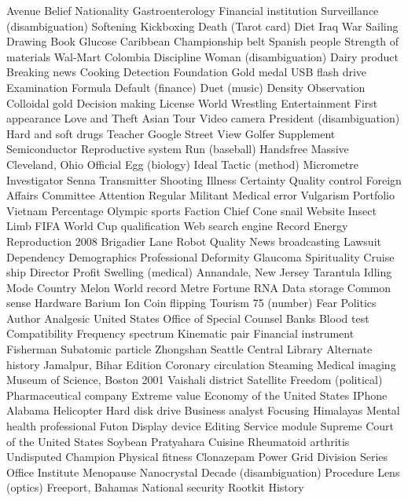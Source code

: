 Avenue  Belief  Nationality  
Gastroenterology  Financial institution  Surveillance (disambiguation)  
Softening  Kickboxing  Death (Tarot card)  
Diet  Iraq War  Sailing  
Drawing  Book  Glucose  
Caribbean  Championship belt  Spanish people  
Strength of materials  Wal-Mart  Colombia  
Discipline  Woman (disambiguation)  Dairy product  
Breaking news  Cooking  Detection  
Foundation  Gold medal  USB flash drive  
Examination  Formula  Default (finance)  
Duet (music)  Density  Observation  
Colloidal gold  Decision making  License  
World Wrestling Entertainment  First appearance  Love and Theft  
Asian Tour  Video camera  President (disambiguation)  
Hard and soft drugs  Teacher  Google Street View  
Golfer  Supplement  Semiconductor  
Reproductive system  Run (baseball)  Handsfree  
Massive  Cleveland, Ohio  Official  
Egg (biology)  Ideal  Tactic (method)  
Micrometre  Investigator  Senna  
Transmitter  Shooting  Illness  
Certainty  Quality control  Foreign Affairs Committee  
Attention  Regular  Militant  
Medical error  Vulgarism  Portfolio  
Vietnam  Percentage  Olympic sports  
Faction  Chief  Cone snail  
Website  Insect  Limb  
FIFA World Cup qualification  Web search engine  Record  
Energy  Reproduction  2008  
Brigadier  Lane  Robot  
Quality  News broadcasting  Lawsuit  
Dependency  Demographics  Professional  
Deformity  Glaucoma  Spirituality  
Cruise ship  Director  Profit  
Swelling (medical)  Annandale, New Jersey  Tarantula  
Idling  Mode  Country  
Melon  World record  Metre  
Fortune  RNA  Data storage  
Common sense  Hardware  Barium  
Ion  Coin flipping  Tourism  
75 (number)  Fear  Politics  
Author  Analgesic  United States Office of Special Counsel  
Banks  Blood test  Compatibility  
Frequency spectrum  Kinematic pair  Financial instrument  
Fisherman  Subatomic particle  Zhongshan  
Seattle Central Library  Alternate history  Jamalpur, Bihar  
Edition  Coronary circulation  Steaming  
Medical imaging  Museum of Science, Boston  2001  
Vaishali district  Satellite  Freedom (political)  
Pharmaceutical company  Extreme value  Economy of the United States  
IPhone  Alabama  Helicopter  
Hard disk drive  Business analyst  Focusing  
Himalayas  Mental health professional  Futon  
Display device  Editing  Service module  
Supreme Court of the United States  Soybean  Pratyahara  
Cuisine  Rheumatoid arthritis  Undisputed Champion  
Physical fitness  Clonazepam  Power Grid  
Division Series  Office  Institute  
Menopause  Nanocrystal  Decade (disambiguation)  
Procedure  Lens (optics)  Freeport, Bahamas  
National security  Rootkit  History  
